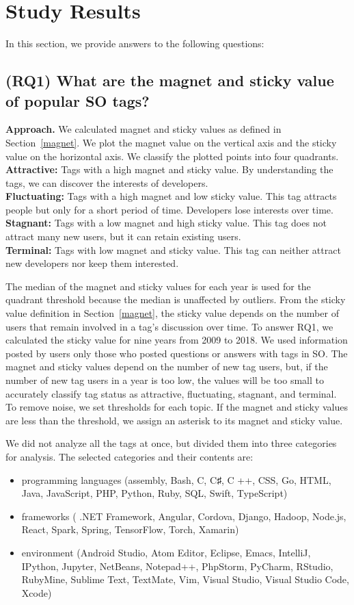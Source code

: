 \documentclass[conference]{IEEEtran}
\begin{document}
\section{Study Results} %
In this section, we provide answers to the following questions:
\subsection{(RQ1) What are the magnet and sticky value of popular SO tags?}

\noindent
\textbf{Approach.}
We calculated magnet and sticky values as defined in Section~\ref{magnet}. We plot the magnet value on the vertical axis and the sticky value on the horizontal axis. We classify the plotted points into four quadrants.\\
\textbf{Attractive:} Tags with a high magnet and sticky value. By understanding the tags, we can discover the interests of developers.\\
\textbf{Fluctuating:} Tags with a high magnet and low sticky value. This tag attracts people but only for a short period of time. Developers lose interests over time.\\
\textbf{Stagnant:} Tags with a low magnet and high sticky value. This tag does not attract many new users, but it can retain existing users.\\
\textbf{Terminal:} Tags with low magnet and sticky value. This tag can neither attract new developers nor keep them interested.

The median of the magnet and sticky values for each year is used for the quadrant threshold because the median is unaffected by outliers. From the sticky value definition in Section~\ref{magnet}, the sticky value depends on the number of users that remain involved in a tag’s discussion over time. To answer RQ1, we calculated the sticky value for nine years from 2009 to 2018. We used information posted by users only those who posted questions or answers with tags in SO.
 The magnet and sticky values depend on the number of new tag users, but, if the number of new tag users in a year is too low, the values will be too small to accurately classify tag status as attractive, fluctuating, stagnant, and terminal. To remove noise, we set thresholds for each topic. If the magnet and sticky values are less than the threshold, we assign an asterisk to its magnet and sticky value.

We did not analyze all the tags at once, but divided them into three categories for analysis. The selected categories and their contents are:
\begin{itemize}
\item programming languages ​​(assembly, Bash, C, C♯, C ++, CSS, Go, HTML, Java, JavaScript, PHP, Python, Ruby, SQL, Swift, TypeScript)
\item frameworks ( .NET Framework, Angular, Cordova, Django, Hadoop, Node.js, React, Spark, Spring, TensorFlow, Torch, Xamarin)
\item environment (Android Studio, Atom Editor, Eclipse, Emacs, IntelliJ, IPython, Jupyter, NetBeans, Notepad++, PhpStorm, PyCharm, RStudio, RubyMine, Sublime Text, TextMate, Vim, Visual Studio, Visual Studio Code, Xcode)
\end{itemize}
\end{document}
